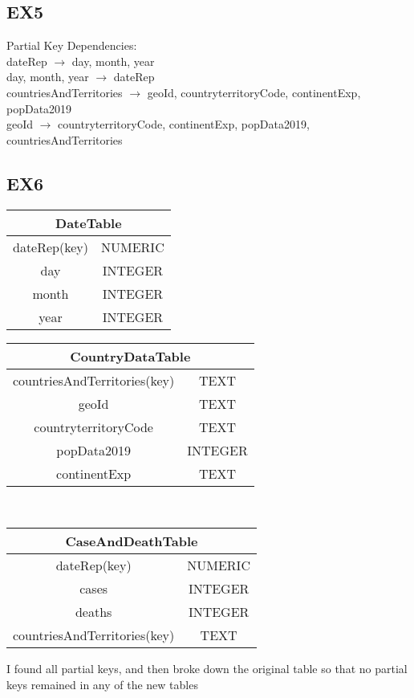 \documentclass{article}
\begin{document}
\subsection{EX5}
Partial Key Dependencies: \\
dateRep $\rightarrow$ day, month, year \\
day, month, year $\rightarrow$ dateRep \\
countriesAndTerritories $\rightarrow$ geoId, countryterritoryCode, continentExp, popData2019 \\
geoId $\rightarrow$ countryterritoryCode, continentExp, popData2019, countriesAndTerritories \\

\subsection{EX6}
\begin{tabular}{|c|c|}
     \hline
     \multicolumn{2}{|c|}{DateTable} \\
     \hline dateRep(key) & NUMERIC \\
     \hline day & INTEGER \\
     \hline month & INTEGER \\
     \hline year & INTEGER \\
     \hline
\end{tabular}
\begin{tabular}{|c|c|}
     \hline
     \multicolumn{2}{|c|}{CountryDataTable} \\
     \hline countriesAndTerritories(key) & TEXT \\
     \hline geoId & TEXT \\
     \hline countryterritoryCode & TEXT \\
     \hline popData2019 & INTEGER \\
     \hline continentExp & TEXT \\
     \hline
\end{tabular}
\\
\begin{tabular}{|c|c|}
     \hline
     \multicolumn{2}{|c|}{CaseAndDeathTable} \\
     \hline dateRep(key) & NUMERIC \\
     \hline cases & INTEGER \\
     \hline deaths & INTEGER \\
     \hline countriesAndTerritories(key) & TEXT \\
     \hline
\end{tabular} \par
I found all partial keys, and then broke down the original table so that no partial keys remained in any of the new tables
\end{document}
